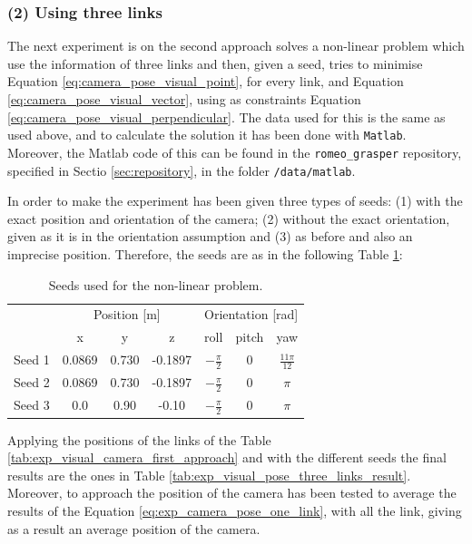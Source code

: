 \documentclass[12pt,a4paper,final,twoside,openright]{report}
\begin{document}
\subsubsection{(2) Using three links}

The next experiment is on the second approach solves a non-linear problem which use the information of three links and then, given a seed, tries to minimise Equation \eqref{eq:camera_pose_visual_point}, for every link, and Equation 
\eqref{eq:camera_pose_visual_vector}, using as constraints Equation \eqref{eq:camera_pose_visual_perpendicular}. The data used for this is the same as used above, and to calculate the solution it has been done with \texttt{Matlab}. Moreover, the Matlab code of this can be found in the \texttt{romeo\_grasper} repository, specified in Sectio \ref{sec:repository}, in the folder \texttt{/data/matlab}. 

In order to make the experiment has been given three types of seeds: (1) with the exact position and orientation of the camera; (2) without the exact orientation, given as it is in the orientation assumption and (3) as before and also an imprecise position. Therefore, the seeds are as in the following Table \ref{tab:exp_visual_camera_second_approach_seed}:

\begin{table}[h]
\begin{center}
\begin{tabular}{|l|c|c|c|c|c|c|}
\hline
 & \multicolumn{3}{|c|}{Position [m]} & \multicolumn{3}{|c|}{Orientation [rad]} \\ \cline{2-7}
 & x & y & z & roll & pitch & yaw \\ \hline
Seed 1 & 0.0869 & 0.730 & -0.1897 & $-\frac{\pi}{2}$ & 0 & $\frac{11 \pi}{12}$ \\ \hline 
Seed 2 & 0.0869 & 0.730 & -0.1897 & $-\frac{\pi}{2}$ & 0 & $\pi$ \\ \hline 
Seed 3 & 0.0 & 0.90 & -0.10 & $-\frac{\pi}{2}$ & 0 & $\pi$ \\ \hline 
\end{tabular}
\caption{Seeds used for the non-linear problem.\label{tab:exp_visual_camera_second_approach_seed}}
\end{center}
\end{table}

\break
Applying the positions of the links of the Table \ref{tab:exp_visual_camera_first_approach} and with the different seeds the final results are the ones in Table \ref{tab:exp_visual_pose_three_links_result}. Moreover, to approach the position of the camera has been tested to average the results of the Equation \eqref{eq:exp_camera_pose_one_link}, with all the link, giving as a result an average position of the camera.
\end{document}
